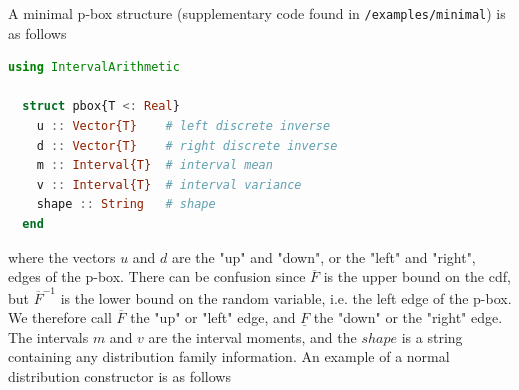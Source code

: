 \documentclass{juliacon}
\begin{document}
A minimal p-box structure (supplementary code found in \texttt{/examples/minimal}) is as follows
\begin{lstlisting}[language = Julia]
  using IntervalArithmetic

  struct pbox{T <: Real}
    u :: Vector{T}    # left discrete inverse
    d :: Vector{T}    # right discrete inverse
    m :: Interval{T}  # interval mean
    v :: Interval{T}  # interval variance
    shape :: String   # shape
  end
\end{lstlisting}
\noindent where the vectors $u$ and $d$ are the "up" and "down", or the "left" and "right", edges of the p-box. There can be confusion since $\overline{F}$ is the upper bound on the cdf, but $\overline{F}^{-1}$ is the lower bound on the random variable, i.e. the left edge of the p-box. We therefore call $\overline{F}$ the "up" or "left" edge, and $\underline{F}$ the "down" or the "right" edge. The intervals $m$ and $v$ are the interval moments, and the $shape$ is a string containing any distribution family information. An example of a normal distribution constructor is as follows
\end{document}
